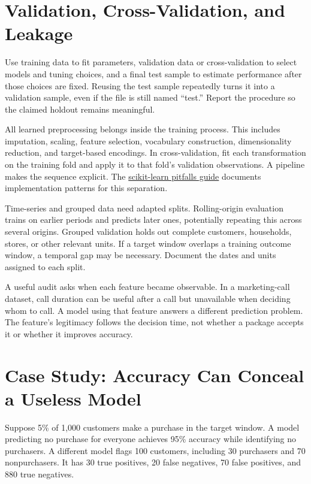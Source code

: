 \hypertarget{M07-validation-cross-validation-and-leakage}{%
\section{Validation, Cross-Validation, and
Leakage}\label{M07-validation-cross-validation-and-leakage}}

\noindent Use training data to fit parameters, validation data or cross-validation
to select models and tuning choices, and a final test sample to estimate
performance after those choices are fixed. Reusing the test sample
repeatedly turns it into a validation sample, even if the file is still
named ``test.'' Report the procedure so the claimed holdout remains
meaningful.

All learned preprocessing belongs inside the training process. This
includes imputation, scaling, feature selection, vocabulary
construction, dimensionality reduction, and target-based encodings. In
cross-validation, fit each transformation on the training fold and apply
it to that fold's validation observations. A pipeline makes the sequence
explicit. The
\href{https://scikit-learn.org/stable/common_pitfalls.html}{scikit-learn
pitfalls guide} documents implementation patterns for this separation.

Time-series and grouped data need adapted splits. Rolling-origin
evaluation trains on earlier periods and predicts later ones,
potentially repeating this across several origins. Grouped validation
holds out complete customers, households, stores, or other relevant
units. If a target window overlaps a training outcome window, a temporal
gap may be necessary. Document the dates and units assigned to each
split.

A useful audit asks when each feature became observable. In a
marketing-call dataset, call duration can be useful after a call but
unavailable when deciding whom to call. A model using that feature
answers a different prediction problem. The feature's legitimacy follows
the decision time, not whether a package accepts it or whether it
improves accuracy.

\hypertarget{M07-case-study-accuracy-can-conceal-a-useless-model}{%
\section{Case Study: Accuracy Can Conceal a Useless
Model}\label{M07-case-study-accuracy-can-conceal-a-useless-model}}

\noindent Suppose 5\% of 1,000 customers make a purchase in the target window. A
model predicting no purchase for everyone achieves 95\% accuracy while
identifying no purchasers. A different model flags 100 customers,
including 30 purchasers and 70 nonpurchasers. It has 30 true positives,
20 false negatives, 70 false positives, and 880 true negatives.

